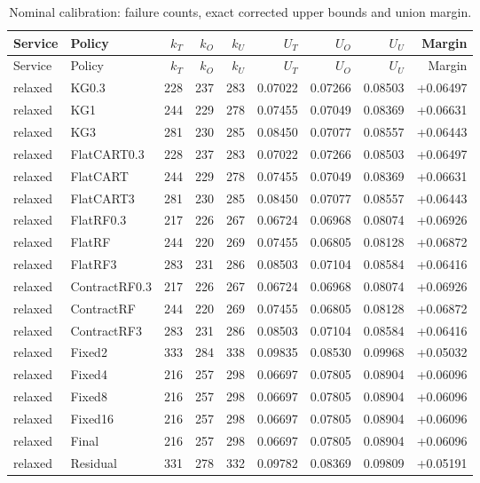 \small\begin{longtable}{@{}llrrrrrrr@{}}
\caption{Nominal calibration: failure counts, exact corrected upper bounds and union margin.}\label{supp:cards-nominal}\\\toprule
Service & Policy & $k_T$ & $k_O$ & $k_U$ & $U_T$ & $U_O$ & $U_U$ & Margin\\\midrule\endfirsthead
\toprule
Service & Policy & $k_T$ & $k_O$ & $k_U$ & $U_T$ & $U_O$ & $U_U$ & Margin\\\midrule\endhead
relaxed & KG0.3 & 228 & 237 & 283 & 0.07022 & 0.07266 & 0.08503 & +0.06497\\
relaxed & KG1 & 244 & 229 & 278 & 0.07455 & 0.07049 & 0.08369 & +0.06631\\
relaxed & KG3 & 281 & 230 & 285 & 0.08450 & 0.07077 & 0.08557 & +0.06443\\
relaxed & FlatCART0.3 & 228 & 237 & 283 & 0.07022 & 0.07266 & 0.08503 & +0.06497\\
relaxed & FlatCART & 244 & 229 & 278 & 0.07455 & 0.07049 & 0.08369 & +0.06631\\
relaxed & FlatCART3 & 281 & 230 & 285 & 0.08450 & 0.07077 & 0.08557 & +0.06443\\
relaxed & FlatRF0.3 & 217 & 226 & 267 & 0.06724 & 0.06968 & 0.08074 & +0.06926\\
relaxed & FlatRF & 244 & 220 & 269 & 0.07455 & 0.06805 & 0.08128 & +0.06872\\
relaxed & FlatRF3 & 283 & 231 & 286 & 0.08503 & 0.07104 & 0.08584 & +0.06416\\
relaxed & ContractRF0.3 & 217 & 226 & 267 & 0.06724 & 0.06968 & 0.08074 & +0.06926\\
relaxed & ContractRF & 244 & 220 & 269 & 0.07455 & 0.06805 & 0.08128 & +0.06872\\
relaxed & ContractRF3 & 283 & 231 & 286 & 0.08503 & 0.07104 & 0.08584 & +0.06416\\
relaxed & Fixed2 & 333 & 284 & 338 & 0.09835 & 0.08530 & 0.09968 & +0.05032\\
relaxed & Fixed4 & 216 & 257 & 298 & 0.06697 & 0.07805 & 0.08904 & +0.06096\\
relaxed & Fixed8 & 216 & 257 & 298 & 0.06697 & 0.07805 & 0.08904 & +0.06096\\
relaxed & Fixed16 & 216 & 257 & 298 & 0.06697 & 0.07805 & 0.08904 & +0.06096\\
relaxed & Final & 216 & 257 & 298 & 0.06697 & 0.07805 & 0.08904 & +0.06096\\
relaxed & Residual & 331 & 278 & 332 & 0.09782 & 0.08369 & 0.09809 & +0.05191\\

\end{longtable}
